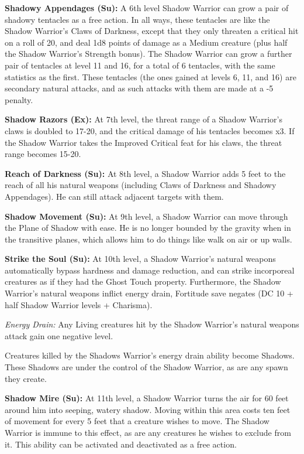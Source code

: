 \textbf{Shadowy Appendages (Su):} A 6th level Shadow Warrior can grow a pair of shadowy tentacles as a free action. In all ways, these tentacles are like the Shadow Warrior's Claws of Darkness, except that they only threaten a critical hit on a roll of 20, and deal 1d8 points of damage as a Medium creature (plus half the Shadow Warrior's Strength bonus). The Shadow Warrior can grow a further pair of tentacles at level 11 and 16, for a total of 6 tentacles, with the same statistics as the first. These tentacles (the ones gained at levels 6, 11, and 16) are secondary natural attacks, and as such attacks with them are made at a -5 penalty.

\textbf{Shadow Razors (Ex):} At 7th level, the threat range of a Shadow Warrior's claws is doubled to 17-20, and the critical damage of his tentacles becomes x3. If the Shadow Warrior takes the Improved Critical feat for his claws, the threat range becomes 15-20.

\textbf{Reach of Darkness (Su):} At 8th level, a Shadow Warrior adds 5 feet to the reach of all his natural weapons (including Claws of Darkness and Shadowy Appendages). He can still attack adjacent targets with them.

\textbf{Shadow Movement (Su):} At 9th level, a Shadow Warrior can move through the Plane of Shadow with ease. He is no longer bounded by the gravity when in the transitive planes, which allows him to do things like walk on air or up walls.

\textbf{Strike the Soul (Su):} At 10th level, a Shadow Warrior's natural weapons automatically bypass hardness and damage reduction, and can strike incorporeal creatures as if they had the Ghost Touch property. Furthermore, the Shadow Warrior's natural weapons inflict energy drain, Fortitude save negates (DC 10 + half Shadow Warrior levels + Charisma). 

\textit{Energy Drain:} Any Living creatures hit by the Shadow Warrior's natural weapons attack gain one negative level.

Creatures killed by the Shadows Warrior's energy drain ability become Shadows. These Shadows are under the control of the Shadow Warrior, as are any spawn they create.

\textbf{Shadow Mire (Su):} At 11th level, a Shadow Warrior turns the air for 60 feet around him into seeping, watery shadow. Moving within this area costs ten feet of movement for every 5 feet that a creature wishes to move. The Shadow Warrior is immune to this effect, as are any creatures he wishes to exclude from it. This ability can be activated and deactivated as a free action.

